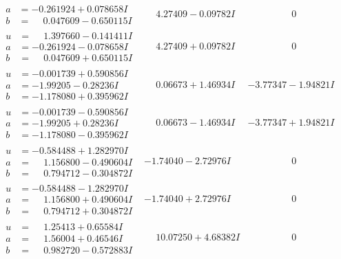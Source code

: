 \documentclass[1p]{elsarticle_modified}
\theoremstyle{definition}
\begin{document}
$$\begin{array}{c|c|c}
\begin{aligned}
a &= -0.261924 + 0.078658 I \\
b &= \phantom{-}0.047609 - 0.650115 I\end{aligned}
 & \phantom{-}4.27409 - 0.09782 I & \phantom{-0.000000 } 0 \\ \hline\begin{aligned}
u &= \phantom{-}1.397660 - 0.141411 I \\
a &= -0.261924 - 0.078658 I \\
b &= \phantom{-}0.047609 + 0.650115 I\end{aligned}
 & \phantom{-}4.27409 + 0.09782 I & \phantom{-0.000000 } 0 \\ \hline\begin{aligned}
u &= -0.001739 + 0.590856 I \\
a &= -1.99205 - 0.28236 I \\
b &= -1.178080 + 0.395962 I\end{aligned}
 & \phantom{-}0.06673 + 1.46934 I & -3.77347 - 1.94821 I \\ \hline\begin{aligned}
u &= -0.001739 - 0.590856 I \\
a &= -1.99205 + 0.28236 I \\
b &= -1.178080 - 0.395962 I\end{aligned}
 & \phantom{-}0.06673 - 1.46934 I & -3.77347 + 1.94821 I \\ \hline\begin{aligned}
u &= -0.584488 + 1.282970 I \\
a &= \phantom{-}1.156800 - 0.490604 I \\
b &= \phantom{-}0.794712 - 0.304872 I\end{aligned}
 & -1.74040 - 2.72976 I & \phantom{-0.000000 } 0 \\ \hline\begin{aligned}
u &= -0.584488 - 1.282970 I \\
a &= \phantom{-}1.156800 + 0.490604 I \\
b &= \phantom{-}0.794712 + 0.304872 I\end{aligned}
 & -1.74040 + 2.72976 I & \phantom{-0.000000 } 0 \\ \hline\begin{aligned}
u &= \phantom{-}1.25413 + 0.65584 I \\
a &= \phantom{-}1.56004 + 0.46546 I \\
b &= \phantom{-}0.982720 - 0.572883 I\end{aligned}
 & \phantom{-}10.07250 + 4.68382 I & \phantom{-0.000000 } 0\\

\end{array}$$
\end{document}
